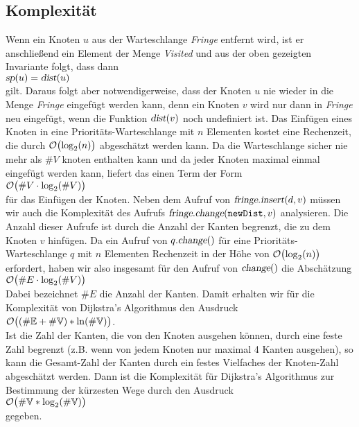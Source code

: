 \subsection{Komplexit\"at}
Wenn ein Knoten $u$ aus der Warteschlange \textsl{Fringe} entfernt wird, ist er anschlie{\ss}end ein Element der
Menge \textsl{Visited} und aus der oben gezeigten Invariante folgt, dass dann 
\\[0.2cm]
\hspace*{1.3cm}
$\textsl{sp}(u) = \textsl{dist}(u)$
\\[0.2cm]
gilt.  Daraus folgt aber notwendigerweise, dass der Knoten $u$ nie wieder in die Menge \textsl{Fringe}
eingef\"ugt werden kann, denn ein Knoten $v$ wird nur dann in \textsl{Fringe} neu eingef\"ugt, wenn die Funktion
$\textsl{dist}(v)$ noch undefiniert ist.  Das Einf\"ugen eines Knoten in eine Priorit\"ats-Warteschlange mit $n$
Elementen kostet eine Rechenzeit, die durch $\mathcal{O}\bigl(\log_2(n)\bigr)$ abgesch\"atzt werden kann.  Da die
Warteschlange sicher nie mehr als $\#V$ knoten enthalten kann und da jeder Knoten maximal einmal eingef\"ugt
werden kann, liefert das einen Term der Form 
\\[0.2cm]
\hspace*{1.3cm}
$\mathcal{O}\bigl(\#V \cdot \log_2(\#V)\bigr)$ 
\\[0.2cm]
f\"ur das Einf\"ugen der Knoten.  Neben dem Aufruf von $\textsl{fringe}.\textsl{insert}(d,v)$ m\"ussen
wir auch die Komplexit\"at des Aufrufs $\textsl{fringe}.\textsl{change}(\mathtt{newDist}, v)$ analysieren.
Die Anzahl dieser Aufrufe ist durch die Anzahl der Kanten begrenzt, die zu dem Knoten $v$ hinf\"ugen.
Da ein Aufruf von $q.\textsl{change}()$ f\"ur eine Priorit\"ats-Warteschlange $q$ mit $n$ Elementen Rechenzeit
in der H\"ohe von $\mathcal{O}\bigl(\log_2(n)\bigr)$ erfordert, haben wir also insgesamt f\"ur den Aufruf von
$\textsl{change}()$ die Absch\"atzung
\\[0.2cm]
\hspace*{1.3cm}
$\mathcal{O}\bigl(\#E \cdot \log_2(\#V)\bigr)$
\\[0.2cm]
Dabei bezeichnet $\#E$ die Anzahl der Kanten. Damit erhalten wir f\"ur die
Komplexit\"at von Dijkstra's Algorithmus den Ausdruck \\[0.2cm]
\hspace*{1.3cm} $\mathcal{O}\bigl((\#{\mathbb E} + \#{\mathbb V}) * \ln(\#{\mathbb V})\bigr)$. \\[0.2cm]
Ist die Zahl der Kanten, die von den Knoten ausgehen k\"onnen, durch eine feste Zahl begrenzt
(z.B. wenn von jedem Knoten nur maximal 4 Kanten ausgehen), so
kann  die Gesamt-Zahl der Kanten durch ein festes Vielfaches der Knoten-Zahl abgesch\"atzt
werden.  Dann ist  die Komplexit\"at f\"ur Dijkstra's Algorithmus zur  Bestimmung der k\"urzesten Wege
durch den Ausdruck  
\\[0.2cm]
\hspace*{1.3cm}
$\mathcal{O}\bigl(\#{\mathbb V} * \log_2(\#{\mathbb V})\bigr)$ 
\\[0.2cm]
gegeben.





